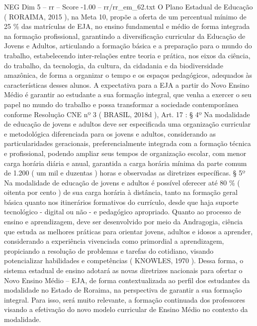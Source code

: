 \begin{textsample}{NEG Dim 5 – rr – Score -1.00 – rr/rr\_em\_62.txt}
O Plano Estadual de Educação ( RORAIMA, 2015 ), na Meta 10, propõe a oferta de um percentual mínimo de 25 \% das matrículas de EJA, no ensino fundamental e médio de forma integrada na formação profissional, garantindo a diversificação curricular da Educação de Jovens e Adultos, articulando a formação básica e a preparação para o mundo do trabalho, estabelecendo inter-relações entre teoria e prática, nos eixos da ciência, do trabalho, da tecnologia, da cultura, da cidadania e da biodiversidade amazônica, de forma a organizar o tempo e os espaços pedagógicos, adequados às características desses alunos.
A expectativa para a EJA a partir do Novo Ensino Médio é garantir ao estudante a sua formação integral, que venha a exercer o seu papel no mundo do trabalho e possa transformar a sociedade contemporânea conforme Resolução CNE nº 3 ( BRASIL, 2018d ), Art. 17 : § 4º Na modalidade de educação de jovens e adultos deve ser especificada uma organização curricular e metodológica diferenciada para os jovens e adultos, considerando as particularidades geracionais, preferencialmente integrada com a formação técnica e profissional, podendo ampliar seus tempos de organização escolar, com menor carga horária diária e anual, garantida a carga horária mínima da parte comum de 1.200 ( um mil e duzentas ) horas e observadas as diretrizes específicas. § 5º Na modalidade de educação de jovens e adultos é possível oferecer até 80 \% ( oitenta por cento ) de sua carga horária à distância, tanto na formação geral básica quanto nos itinerários formativos do currículo, desde que haja suporte tecnológico - digital ou não - e pedagógico apropriado.
Quanto ao processo de ensino e aprendizagem, deve ser desenvolvido por meio da Andragogia, ciência que estuda as melhores práticas para orientar jovens, adultos e idosos a aprender, considerando a experiência vivenciada como primordial a aprendizagem, propiciando a resolução de problemas e tarefas do cotidiano, visando potencializar habilidades e competências ( KNOWLES, 1970 ).
Dessa forma, o sistema estadual de ensino adotará as novas diretrizes nacionais para ofertar o Novo Ensino Médio – EJA, de forma contextualizada ao perfil dos estudantes da modalidade no Estado de Roraima, na perspectiva de garantir a sua formação integral.
Para isso, será muito relevante, a formação continuada dos professores visando a efetivação do novo modelo curricular de Ensino Médio no contexto da modalidade.

\end{textsample}
